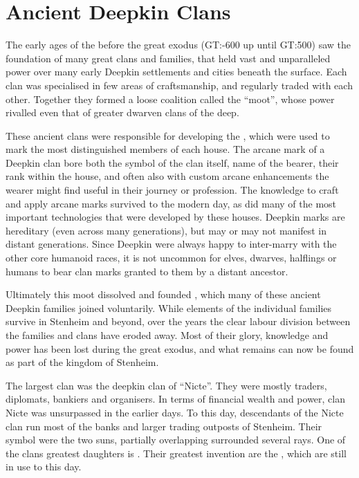\section{Ancient Deepkin Clans}
\label{sec:Deepkin Clans}

The early ages of the before the great exodus (GT:-600 up until GT:500) saw the
foundation of many great  clans and families, that held
vast and unparalleled power over many early Deepkin settlements and cities
beneath the surface. Each clan was specialised in few areas of craftsmanship,
and regularly traded with each other. Together they formed a loose coalition
called the ``moot'', whose power rivalled even that of greater dwarven clans
of the deep.

These ancient clans were responsible for developing the , which were used to mark the most distinguished members of each house.
The arcane mark of a Deepkin clan bore both the symbol of the clan itself,
name of the bearer, their rank within the house, and often also with custom
arcane enhancements the wearer might find useful in their journey or
profession. The knowledge to craft and apply arcane marks survived to the
modern day, as did many of the most important technologies that were developed
by these houses. Deepkin marks are hereditary (even across many generations),
but may or may not manifest in distant generations. Since Deepkin were always
happy to inter-marry with the other core humanoid races, it is not uncommon
for elves, dwarves, halflings or humans to bear clan marks granted to them by
a distant ancestor.

Ultimately this moot dissolved and founded , which many
of these ancient Deepkin families joined voluntarily. While elements of the
individual families survive in Stenheim and beyond, over the years the clear
labour division between the families and clans have eroded away. Most of their
glory, knowledge and power has been lost during the great exodus, and what
remains can now be found as part of the kingdom of Stenheim.

\label{sec:Nicte}
The largest clan was the deepkin clan of ``Nicte''. They were mostly traders,
diplomats, bankiers and organisers. In terms of financial wealth and power,
clan Nicte was unsurpassed in the earlier days. To this day, descendants of
the Nicte clan run most of the banks and larger trading outposts of Stenheim.
Their symbol were the two suns, partially overlapping surrounded several rays.
One of the clans greatest daughters is . Their greatest
invention are the , which are still in use to this
day.

